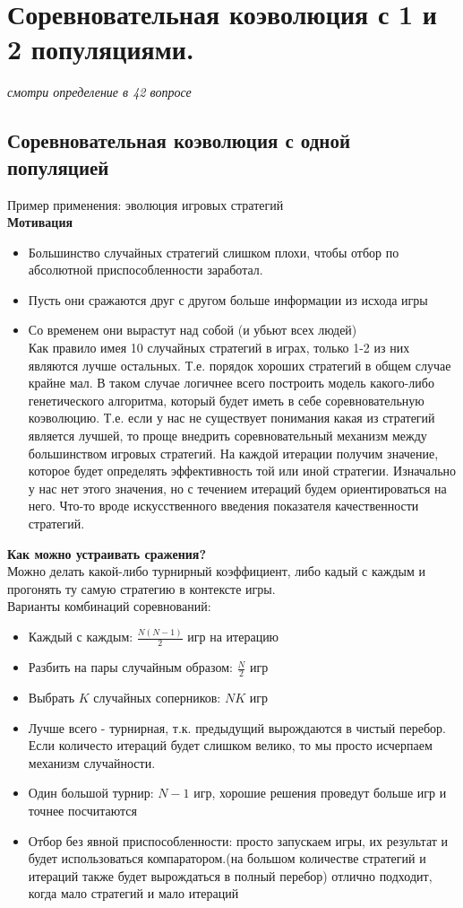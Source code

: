 \section{Соревновательная коэволюция с 1 и 2 популяциями.}
\textit{смотри определение в 42 вопросе}
\subsection{Соревновательная коэволюция с одной популяцией}
Пример применения: эволюция игровых стратегий\\
\textbf{Мотивация}
\begin{itemize}
    \item Большинство случайных стратегий слишком плохи, чтобы отбор по абсолютной приспособленности заработал.
    \item Пусть они сражаются друг с другом больше информации из исхода игры
    \item Со временем они вырастут над собой (и убьют всех людей)\\
    Как правило имея 10 случайных стратегий в играх, только 1-2 из них являются лучше остальных. Т.е. порядок хороших стратегий в общем случае крайне мал. В таком случае логичнее всего построить модель какого-либо генетического алгоритма, который будет иметь в себе соревновательную коэволюцию. Т.е. если у нас не существует понимания какая из стратегий является лучшей, то проще внедрить соревновательный механизм между большинством игровых стратегий. На каждой итерации получим значение, которое будет определять эффективность той или иной стратегии. Изначально у нас нет этого значения, но с течением итераций будем ориентироваться на него. Что-то вроде искусственного введения показателя качественности стратегий.
\end{itemize}

\textbf{Как можно устраивать сражения?}\\
    Можно делать какой-либо турнирный коэффициент, либо кадый с каждым и прогонять ту самую стратегию в контексте игры.\\
    Варианты комбинаций соревнований:\\
\begin{itemize}
    \item Каждый с каждым: $\frac{N(N-1)}{2}$ игр на итерацию
    \item Разбить на пары случайным образом: $\frac{N}{2}$ игр
    \item Выбрать $K$ случайных соперников: $NK$ игр
    \item Лучше всего - турнирная, т.к. предыдущий вырождаются в чистый перебор. Если количесто итераций будет слишком велико, то мы просто исчерпаем механизм случайности.
    \item Один большой турнир: $N-1$ игр, хорошие решения проведут больше игр и точнее посчитаются
    \item Отбор без явной приспособленности: просто запускаем игры, их результат и будет использоваться компаратором.(на большом количестве стратегий и итераций также будет вырождаться в полный перебор) отлично подходит, когда мало стратегий и мало итераций
\end{itemize}
